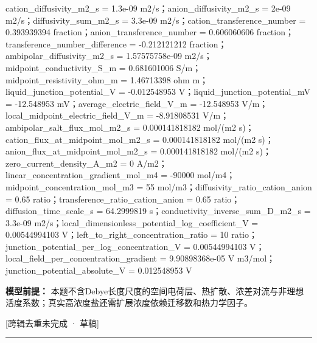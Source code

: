 \documentclass[UTF8,11pt,a4paper]{ctexart}
\begin{document}
cation\_diffusivity\_m2\_s = 1.3e-09 m2/s；anion\_diffusivity\_m2\_s = 2e-09 m2/s；diffusivity\_sum\_m2\_s = 3.3e-09 m2/s；cation\_transference\_number = 0.393939394 fraction；anion\_transference\_number = 0.606060606 fraction；transference\_number\_difference = -0.212121212 fraction；ambipolar\_diffusivity\_m2\_s = 1.57575758e-09 m2/s；midpoint\_conductivity\_S\_m = 0.681601006 S/m；midpoint\_resistivity\_ohm\_m = 1.46713398 ohm m；liquid\_junction\_potential\_V = -0.012548953 V；liquid\_junction\_potential\_mV = -12.548953 mV；average\_electric\_field\_V\_m = -12.548953 V/m；local\_midpoint\_electric\_field\_V\_m = -8.91808531 V/m；ambipolar\_salt\_flux\_mol\_m2\_s = 0.000141818182 mol/(m2 s)；cation\_flux\_at\_midpoint\_mol\_m2\_s = 0.000141818182 mol/(m2 s)；anion\_flux\_at\_midpoint\_mol\_m2\_s = 0.000141818182 mol/(m2 s)；zero\_current\_density\_A\_m2 = 0 A/m2；linear\_concentration\_gradient\_mol\_m4 = -90000 mol/m4；midpoint\_concentration\_mol\_m3 = 55 mol/m3；diffusivity\_ratio\_cation\_anion = 0.65 ratio；transference\_ratio\_cation\_anion = 0.65 ratio；diffusion\_time\_scale\_s = 64.2999819 s；conductivity\_inverse\_sum\_D\_m2\_s = 3.3e-09 m2/s；local\_dimensionless\_potential\_log\_coefficient\_V = 0.00544994103 V；left\_to\_right\_concentration\_ratio = 10 ratio；junction\_potential\_per\_log\_concentration\_V = 0.00544994103 V；local\_field\_per\_concentration\_gradient = 9.90898368e-05 V m3/mol；junction\_potential\_absolute\_V = 0.012548953 V\par
\noindent\textbf{模型前提：}
本题不含Debye长度尺度的空间电荷层、热扩散、浓差对流与非理想活度系数；真实高浓度盐还需扩展浓度依赖迁移数和热力学因子。\par
\noindent\textcolor{red!65!black}{[跨辑去重未完成 · 草稿]} \par
\medskip\hrule\medskip
{}
\end{document}
